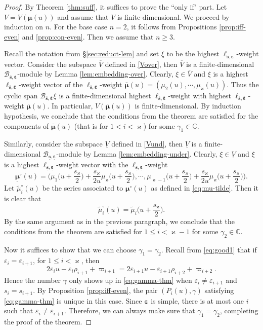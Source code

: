 \documentclass[11pt,reqno]{amsart}
\numberwithin{equation}{section}
\theoremstyle{definition}
\theoremstyle{remark}
\newcommand{\bC}{\mathbb{C}}
\newcommand{\tl}{\tilde}
\newcommand{\gge}{\geqslant}
\newcommand{\lle}{\leqslant}
\newcommand{\ka}{\varkappa}
\newcommand{\ve}{\varepsilon}
\newcommand{\s}{{\bm s}}
\newcommand{\ovs}{{\overline{\bm s}}}
\newcommand{\ove}{{\overline{\bm \varepsilon}}}
\newcommand{\uns}{{\underline{\bm s}}}
\newcommand{\une}{{\underline{\bm \varepsilon}}}
\begin{document}
\begin{proof} By Theorem \ref{thm:suff}, it suffices to prove the ``only if" part. Let $V=V(\bm\mu(u))$ and assume that $V$ is finite-dimensional. We proceed by induction on $n$. For the base case $n=2$, it follows from Propositions \ref{prop:iff-even} and \ref{prop:con-even}. Then we assume that $n\gge 3$.

Recall the notation from \S \ref{sec:reduct-lem} and set $\xi$ to be the highest $\ell_{\s,\bm\ve}$-weight vector. Consider the subspace $\overline V$ defined in \eqref{Vover}, then $\overline V$ is a finite-dimensional $\mathscr B_{\ovs,\ove}$-module by Lemma \ref{lem:embedding-over}. Clearly, $\xi\in\overline V$ and $\xi$ is a highest $\ell_{\ovs,\ove}$-weight vector of the $\ell_{\ovs,\ove}$-weight $\overline{\bm\mu}(u)=(\mu_2(u),\cdots,\mu_\ka(u))$. Thus the cyclic span $\mathscr B_{\ovs,\ove}\xi$ is a finite-dimensional highest $\ell_{\ovs,\ove}$-weight with highest $\ell_{\ovs,\ove}$-weight $\overline{\bm\mu}(u)$. In particular, $V(\overline{\bm\mu}(u))$ is finite-dimensional. By induction hypothesis, we conclude that the conditions from the theorem are satisfied for the components of $\overline{\bm\mu}(u)$ (that is for $1<i<\ka$) for some $\gamma_1\in\bC$.

Similarly, consider the subspace $\underline{V}$ defined in \eqref{Vund}, then $\underline V$ is a finite-dimensional $\mathscr B_{\uns,\une}$-module by Lemma \ref{lem:embedding-under}. Clearly, $\xi\in\underline V$ and $\xi$ is a highest $\ell_{\uns,\une}$-weight vector with the $\ell_{\uns,\une}$-weight
\[
\underline{\bm\mu}^\circ(u)=\Big(\mu_1\Big(u+\frac{s_\ka}{2}\Big)+\frac{s_\ka}{2u}\mu_{\ka}\Big(u+\frac{s_\ka}{2}\Big),\cdots,\mu_{\ka-1}\Big(u+\frac{s_\ka}{2}\Big)+\frac{s_\ka}{2u}\mu_{\ka}\Big(u+\frac{s_\ka}{2}\Big)\Big).
\]
Let $\tl{\mu}_i^\circ(u)$ be the series associated to $\bm\mu^\circ(u)$ as defined in \eqref{eq:mu-tilde}. Then it is clear that
\[
\tl{\mu}_i^\circ(u)=\tl{\mu}_i\Big(u+\frac{s_\ka}{2}\Big).
\]
By the same argument as in the previous paragraph, we conclude that the conditions from the theorem are satisfied for $1\lle i<\ka-1$ for some $\gamma_2\in\bC$.

Now it suffices to show that we can choose $\gamma_1=\gamma_2$. Recall from \eqref{eq:good1} that if $\ve_i=\ve_{i+1}$, for $1\lle i<\ka$, then
$$
2\ve_i u-\ve_i\rho_{i+1}+\varpi_{i+1}=2\ve_{i+1} u-\ve_{i+1}\rho_{i+2}+\varpi_{i+2}.
$$
Hence the number $\gamma$ only shows up in \eqref{eq:gamma-thm} when $\ve_i\ne \ve_{i+1}$ and $s_i= s_{i+1}$. By Proposition \ref{prop:iff-even}, the pair $(P_i(u),\gamma)$ satisfying \eqref{eq:gamma-thm} is unique in this case. Since $\bm\ve$ is simple, there is at most one $i$ such that $\ve_i\ne \ve_{i+1}$. Therefore, we can always make sure that $\gamma_1=\gamma_2$, completing the proof of the theorem.
\end{proof}
\end{document}
